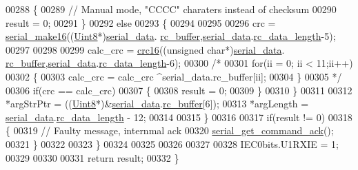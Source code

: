 \begin{DoxyCode}
00288             \{
00289                 \textcolor{comment}{// Manual mode, "CCCC" charaters instead of checksum}
00290                 result = 0;
00291             \}
00292             \textcolor{keywordflow}{else}
00293             \{
00294 
00295                 
00296                 crc  = \hyperlink{a00030_abc17de32f14103a5be219df0d4ad9176}{serial\_make16}((\hyperlink{a00072_af84840501dec18061d18a68c162a8fa2}{Uint8}*)\hyperlink{a00030_a77d3b77ccd59a0065642bf1ac7887b9d}{serial\_data}.
      \hyperlink{a00030_ac734cb8be27f86bd99edc539434883a4}{rc\_buffer},\hyperlink{a00030_a77d3b77ccd59a0065642bf1ac7887b9d}{serial\_data}.\hyperlink{a00030_ab136d4fef2c523afd55b6ca74c46d7cc}{rc\_data\_length}-5);
00297                 
00298            
00299                 calc\_crc = \hyperlink{a00021_a6553827687db2137ee550ad6e1d2f316}{crc16}((\textcolor{keywordtype}{unsigned} \textcolor{keywordtype}{char}*)\hyperlink{a00030_a77d3b77ccd59a0065642bf1ac7887b9d}{serial\_data}.
      \hyperlink{a00030_ac734cb8be27f86bd99edc539434883a4}{rc\_buffer},\hyperlink{a00030_a77d3b77ccd59a0065642bf1ac7887b9d}{serial\_data}.\hyperlink{a00030_ab136d4fef2c523afd55b6ca74c46d7cc}{rc\_data\_length}-6);
00300               \textcolor{comment}{/*}
00301 \textcolor{comment}{                for(ii = 0; ii < 11;ii++)}
00302 \textcolor{comment}{                \{}
00303 \textcolor{comment}{                    calc\_crc = calc\_crc ^serial\_data.rc\_buffer[ii];}
00304 \textcolor{comment}{                \}}
00305 \textcolor{comment}{              */}
00306                 \textcolor{keywordflow}{if}(crc == calc\_crc)
00307                 \{
00308                     result = 0;
00309                 \}
00310             \}
00311 
00312             *argStrPtr =  ((\hyperlink{a00072_af84840501dec18061d18a68c162a8fa2}{Uint8}*)&\hyperlink{a00030_a77d3b77ccd59a0065642bf1ac7887b9d}{serial\_data}.\hyperlink{a00030_ac734cb8be27f86bd99edc539434883a4}{rc\_buffer}[6]);
00313             *argLength = \hyperlink{a00030_a77d3b77ccd59a0065642bf1ac7887b9d}{serial\_data}.\hyperlink{a00030_ab136d4fef2c523afd55b6ca74c46d7cc}{rc\_data\_length} - 12;
00314 
00315        \}
00316 
00317        \textcolor{keywordflow}{if}(result != 0)
00318        \{
00319             \textcolor{comment}{// Faulty message, internmal ack}
00320             \hyperlink{a00030_a7fc7421ed15d6e4516e9878e7455d715}{serial\_get\_command\_ack}();
00321        \}
00322 
00323     \}
00324 
00325 
00326 
00327 
00328     IEC0bits.U1RXIE = 1;
00329 
00330 
00331     \textcolor{keywordflow}{return} result;
00332 \}
\end{DoxyCode}


